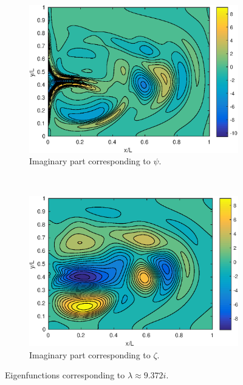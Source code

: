 \begin{figure}[h]
{\begin{subfigure}[b]{0.6\textwidth}
        \includegraphics[width=\textwidth]{images/eigenvector_hop_1_3.eps}
        \caption{Imaginary part corresponding to $\psi$.}
        \label{fig:imag_psi}
    \end{subfigure}
    ~
    \begin{subfigure}[b]{0.6\textwidth}
        \includegraphics[width=\textwidth]{images/eigenvector_hop_2_3.eps}
        \caption{Imaginary part corresponding to $\zeta$.}
        \label{fig:imag_zeta}
    \end{subfigure}
    }
    \caption{Eigenfunctions corresponding to $\lambda \approx 9.372i$.}\label{fig:eigenfunction}
\end{figure}